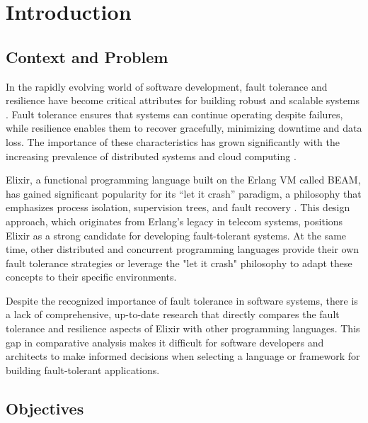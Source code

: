 % 
\chapter{Introduction} %
\label{chap:Intro} %


%
\section{Context and Problem}

In the rapidly evolving world of software development, fault tolerance and resilience have become critical attributes for building robust and scalable systems \cite{Kleppmann2017}. Fault tolerance ensures that systems can continue operating despite failures, while resilience enables them to recover gracefully, minimizing downtime and data loss. The importance of these characteristics has grown significantly with the increasing prevalence of distributed systems and cloud computing \cite{Tanenbaum2023,Kleppmann2017}.

Elixir, a functional programming language built on the Erlang \gls{VM} called \gls{BEAM}, has gained significant popularity for its “let it crash” paradigm, a philosophy that emphasizes process isolation, supervision trees, and fault recovery \cite{Juric2024,go-docs,Valkov2018}. This design approach, which originates from Erlang’s legacy in telecom systems, positions Elixir as a strong candidate for developing fault-tolerant systems. At the same time, other distributed and concurrent programming languages provide their own fault tolerance strategies or leverage the "let it crash" philosophy to adapt these concepts to their specific environments.

Despite the recognized importance of fault tolerance in software systems, there is a lack of comprehensive, up-to-date research that directly compares the fault tolerance and resilience aspects of Elixir with other programming languages. This gap in comparative analysis makes it difficult for software developers and architects to make informed decisions when selecting a language or framework for building fault-tolerant applications.

\section{Objectives}

